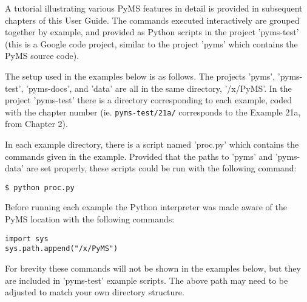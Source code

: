 A tutorial illustrating various PyMS features in detail is provided
in subsequent chapters of this User Guide. The commands executed
interactively are grouped together by example, and provided as
Python scripts in the project 'pyms-test' (this is a Google code
project, similar to the project 'pyms' which contains the PyMS
source code).

The setup used in the examples below is as follows. The projects 'pyms',
'pyms-test', 'pyms-docs', and 'data' are all in the same directory,
'/x/PyMS'. In the project 'pyms-test' there is a directory corresponding
to each example, coded with the chapter number (ie. {\tt pyms-test/21a/}
corresponds to the Example 21a, from Chapter 2).

In each example directory, there is a script named 'proc.py' which
contains the commands given in the example.  Provided that the paths
to 'pyms' and 'pyms-data' are set properly, these scripts could be
run with the following command:

\begin{verbatim}
$ python proc.py
\end{verbatim}

Before running each example the Python interpreter was made aware of
the PyMS location with the following commands:

\begin{verbatim}
import sys
sys.path.append("/x/PyMS")
\end{verbatim}

For brevity these commands will not be shown in the examples below,
but they are included in 'pyms-test' example scripts.  The above
path may need to be adjusted to match your own directory structure.



